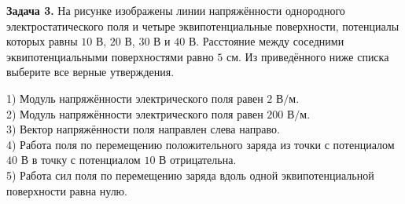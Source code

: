 \begin{taskbasic}[code={\label{task:elem_pot_v17_n15}}]
\textbf{Задача 3.} На рисунке изображены линии напряжённости однородного электростатического поля и четыре эквипотенциальные поверхности, потенциалы которых равны $10\text{ В}$, $20\text{ В}$, $30\text{ В}$ и $40\text{ В}$. Расстояние между соседними эквипотенциальными поверхностями равно $5\text{ см}$. Из приведённого ниже списка выберите все верные утверждения.

\nopagebreak\smallskip
\begin{center}
\end{center}

1) Модуль напряжённости электрического поля равен $2\text{ В/м}$.\\
2) Модуль напряжённости электрического поля равен $200\text{ В/м}$.\\
3) Вектор напряжённости поля направлен слева направо.\\
4) Работа поля по перемещению положительного заряда из точки с потенциалом $40\text{ В}$ в точку с потенциалом $10\text{ В}$ отрицательна.\\
5) Работа сил поля по перемещению заряда вдоль одной эквипотенциальной поверхности равна нулю.

\end{taskbasic}


